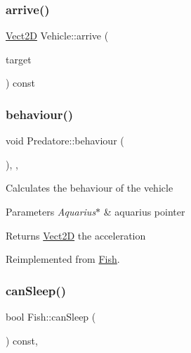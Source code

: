 \subsubsection{\texorpdfstring{arrive()}{arrive()}}
{\footnotesize\ttfamily \hyperlink{classVect2D}{Vect2D} Vehicle\+::arrive (\begin{DoxyParamCaption}\item[{const \hyperlink{classVect2D}{Vect2D} \&}]{target }\end{DoxyParamCaption}) const\hspace{0.3cm}{\ttfamily [inherited]}}

\mbox{\label{classPredatore_adc1dc0f0cdd41923d87dc23b4fc550a7_adc1dc0f0cdd41923d87dc23b4fc550a7}} 
\subsubsection{\texorpdfstring{behaviour()}{behaviour()}}
{\footnotesize\ttfamily void Predatore\+::behaviour (\begin{DoxyParamCaption}\item[{\hyperlink{classAquarius}{Aquarius} $\ast$}]{ }\end{DoxyParamCaption})\hspace{0.3cm}{\ttfamily [override]}, {\ttfamily [protected]}, {\ttfamily [virtual]}}

Calculates the behaviour of the vehicle 
\begin{DoxyParams}{Parameters}
{\em Aquarius$\ast$} & aquarius pointer \\
\hline
\end{DoxyParams}
\begin{DoxyReturn}{Returns}
\hyperlink{classVect2D}{Vect2D} the acceleration 
\end{DoxyReturn}


Reimplemented from \hyperlink{classFish_abffd423bc7a7730aafa80ec9c0cec9a0_abffd423bc7a7730aafa80ec9c0cec9a0}{Fish}.

\mbox{\label{classFish_a9a94edb09498e8d0d2381c2cc3e2e9dc_a9a94edb09498e8d0d2381c2cc3e2e9dc}} 
\subsubsection{\texorpdfstring{can\+Sleep()}{canSleep()}}
{\footnotesize\ttfamily bool Fish\+::can\+Sleep (\begin{DoxyParamCaption}{ }\end{DoxyParamCaption}) const\hspace{0.3cm}{\ttfamily [virtual]}, {\ttfamily [inherited]}}

